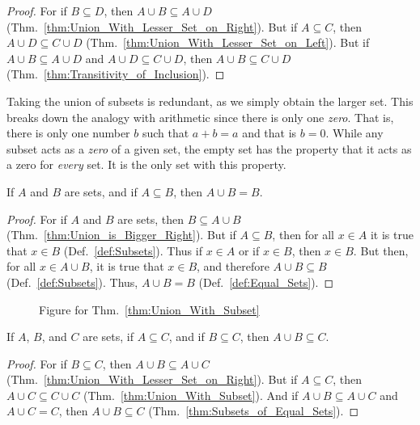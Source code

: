         \begin{proof}
            For if $B\subseteq{D}$, then $A\cup{B}\subseteq{A}\cup{D}$
            (Thm.~\ref{thm:Union_With_Lesser_Set_on_Right}). But if
            $A\subseteq{C}$, then $A\cup{D}\subseteq{C}\cup{D}$
            (Thm.~\ref{thm:Union_With_Lesser_Set_on_Left}). But if
            $A\cup{B}\subseteq{A}\cup{D}$ and $A\cup{D}\subseteq{C}\cup{D}$,
            then $A\cup{B}\subseteq{C}\cup{D}$
            (Thm.~\ref{thm:Transitivity_of_Inclusion}).
        \end{proof}
        Taking the union of subsets is redundant, as we simply obtain the larger
        set. This breaks down the analogy with arithmetic since there is only
        one \textit{zero}. That is, there is only one number $b$ such that
        $a+b=a$ and that is $b=0$. While any subset acts as a \textit{zero} of
        a given set, the empty set has the property that it acts as a zero for
        \textit{every} set. It is the only set with this property.
        \begin{theorem}
            \label{thm:Union_With_Subset}%
            If $A$ and $B$ are sets, and if $A\subseteq{B}$, then $A\cup{B}=B$.
        \end{theorem}
        \begin{proof}
            For if $A$ and $B$ are sets, then $B\subseteq{A}\cup{B}$
            (Thm.~\ref{thm:Union_is_Bigger_Right}). But if $A\subseteq{B}$, then
            for all $x\in{A}$ it is true that $x\in{B}$
            (Def.~\ref{def:Subsets}). Thus if $x\in{A}$ or if $x\in{B}$, then
            $x\in{B}$. But then, for all $x\in{A}\cup{B}$, it is true that
            $x\in{B}$, and therefore $A\cup{B}\subseteq{B}$
            (Def.~\ref{def:Subsets}). Thus, $A\cup{B}=B$
            (Def.~\ref{def:Equal_Sets}).
        \end{proof}
        \begin{figure}[H]
            \centering
            \captionsetup{type=figure}
            
            \caption{Figure for Thm.~\ref{thm:Union_With_Subset}}
            \label{fig:Thm_Union_with_Subset}
        \end{figure}
        \begin{theorem}
            \label{thm:Union_of_Subsets_is_Still_Subset}%
            If $A$, $B$, and $C$ are sets, if $A\subseteq{C}$, and if
            $B\subseteq{C}$, then $A\cup{B}\subseteq{C}$.
        \end{theorem}
        \begin{proof}
            For if $B\subseteq{C}$, then $A\cup{B}\subseteq{A}\cup{C}$
            (Thm.~\ref{thm:Union_With_Lesser_Set_on_Right}). But if
            $A\subseteq{C}$, then $A\cup{C}\subseteq{C}\cup{C}$
            (Thm.~\ref{thm:Union_With_Subset}). And if
            $A\cup{B}\subseteq{A}\cup{C}$ and $A\cup{C}=C$, then
            $A\cup{B}\subseteq{C}$ (Thm.~\ref{thm:Subsets_of_Equal_Sets}).
        \end{proof}
